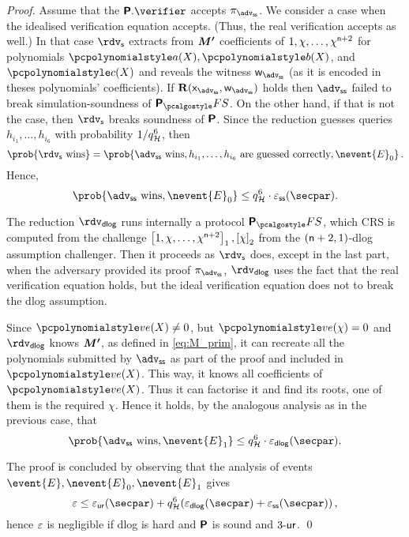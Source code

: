 \let\accentvec\vec \documentclass[runningheads,10pt]{llncs}
\def\vec#1{\mathchoice{\mbox{\boldmath$\displaystyle#1$}}
{\mbox{\boldmath$\textstyle#1$}} {\mbox{\boldmath$\scriptstyle#1$}}
{\mbox{\boldmath$\scriptscriptstyle#1$}}}
\begin{document}
\begin{proof}
	Assume that the $\plonkprot.\verifier$ accepts $\zkproof_\advss$. We consider a case when the idealised verification equation accepts. (Thus, the real verification accepts as well.) 
	In that case $\rdvs$ extracts from $\vec{M'}$ coefficients of $1, \chi, \ldots, \chi^{\mathsf{n} + 2}$ for polynomials $\p{a}(X), \p{b}(X)$, and $\p{c}(X)$ and reveals the witness $\wit_\advss$ (as it is encoded in theses polynomials' coefficients).
	If $\REL(\inp_\advss, \wit_\advss)$ holds then $\advss$ failed to break simulation-soundness of $\plonkprotfs$. On the other hand, if that is not the case, then $\rdvs$ breaks soundness of $\bm{\mathsf{P}}$.
	Since the reduction guesses queries $h_{i_1}, \ldots, h_{i_6}$ with probability $1/q_{\mathcal{H}}^6$, then 
	\[
		\prob{\rdvs \text{ wins}} = \prob{\advss \text{ wins}, h_{i_1}, \ldots, h_{i_6} \text{ are guessed correctly}, \nevent{E}_0}\,.
	\] 
	Hence,
	\[
		\prob{\advss \text{ wins}, \nevent{E}_0} \leq q_\ro^6 \cdot \epsss(\secpar).
	\]

	The reduction $\rdvdlog$ runs internally a protocol $\plonkprotfs$, which CRS is computed from the challenge $\left[1, \chi, \ldots, \chi^{\mathsf{n} + 2}\right]_{1}, \left[\chi\right]_{2}$ from the $(\mathsf{n} + 2, 1)$-dlog assumption challenger. 
	Then it proceeds as $\rdvs$ does, except in the last part, when the adversary provided its proof $\zkproof_\advss$, $\rdvdlog$ uses the fact that the real verification equation holds, but the ideal verification equation does not to break the dlog assumption. 

	Since $\vereq(X) \neq 0$, but $\vereq(\chi) = 0$ and $\rdvdlog$ knows
	$\vec{M'}$, as defined in \cref{eq:M_prim}, it can recreate all the polynomials
	submitted by $\advss$ as part of the proof and included in $\vereq(X)$. This
	way, it knows all coefficients of $\vereq(X)$. Thus it can factorise it and find
	its roots, one of them is the required $\chi$. Hence it holds, by the analogous analysis as in the previous case, that
	\[
		\prob{\advss \text{ wins}, \nevent{E}_1} \leq q_\ro^6 \cdot \eps_{\dlog}(\secpar).
	\]

	The proof is concluded by observing that the analysis of events $\event{E}, \nevent{E}_0, \nevent{E}_1$ gives
	\[
		\eps \leq \epsur(\secpar) + q_\ro^6 (\eps_{\dlog}(\secpar) + \epsss(\secpar))\,,
	\]
	hence $\varepsilon$ is negligible if dlog is hard and $\bm{\mathsf{P}}$ is sound and ${3\text{-}\mathsf{ur}}$.
	\qed
	\end{proof}
\end{document}
